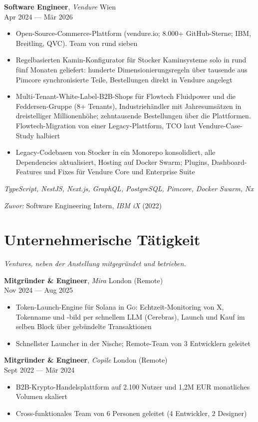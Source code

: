 \documentclass[a4paper,10pt]{article}
\newcommand{\entry}[4]{%
  \textbf{#1}, \textit{#2} \hfill #3 \\ \vspace{-2pt}
  {\small #4}%
}
\begin{document}
\vspace{3pt}
\entry{Software Engineer}{Vendure}{Wien}{Apr 2024 --- M\"ar 2026}
\begin{itemize}
  \item Open-Source-Commerce-Plattform (vendure.io; 8.000+ GitHub-Sterne; IBM, Breitling, QVC). Team von rund sieben
  \item Regelbasierten Kamin-Konfigurator f\"ur Stocker Kaminsysteme solo in rund f\"unf Monaten geliefert: hunderte Dimensionierungsregeln \"uber tausende aus Pimcore synchronisierte Teile, Bestellungen direkt in Vendure angelegt
  \item Multi-Tenant-White-Label-B2B-Shops f\"ur Flowtech Fluidpower und die Feddersen-Gruppe (8+ Tenants), Industrieh\"andler mit Jahresums\"atzen in dreistelliger Millionenh\"ohe; zehntausende Bestellungen \"uber die Plattformen. Flowtech-Migration von einer Legacy-Plattform, TCO laut Vendure-Case-Study halbiert
  \item Legacy-Codebasen von Stocker in ein Monorepo konsolidiert, alle Dependencies aktualisiert, Hosting auf Docker Swarm; Plugins, Dashboard-Features und Fixes f\"ur Vendure Core und Enterprise Suite
\end{itemize}
{\small\textit{TypeScript, NestJS, Next.js, GraphQL, PostgreSQL, Pimcore, Docker Swarm, Nx}}

\vspace{3pt}
{\small\textit{Zuvor:} Software Engineering Intern, \textit{IBM iX} (2022)}

\section{Unternehmerische T\"atigkeit}
\vspace{-1pt}
{\small\textit{Ventures, neben der Anstellung mitgegr\"undet und betrieben.}}
\vspace{3pt}

\entry{Mitgr\"under \& Engineer}{Mira}{London (Remote)}{Nov 2024 --- Aug 2025}
\begin{itemize}
  \item Token-Launch-Engine f\"ur Solana in Go: Echtzeit-Monitoring von X, Tokenname und -bild per schnellem LLM (Cerebras), Launch und Kauf im selben Block \"uber geb\"undelte Transaktionen
  \item Schnellster Launcher in der Nische; Remote-Team von 3 Entwicklern geleitet
\end{itemize}

\vspace{3pt}
\entry{Mitgr\"under \& Engineer}{Copile}{London (Remote)}{Sept 2022 --- M\"ar 2024}
\begin{itemize}
  \item B2B-Krypto-Handelsplattform auf 2.100 Nutzer und 1,2M EUR monatliches Volumen skaliert
  \item Cross-funktionales Team von 6 Personen geleitet (4 Entwickler, 2 Designer)
\end{itemize}
\end{document}
